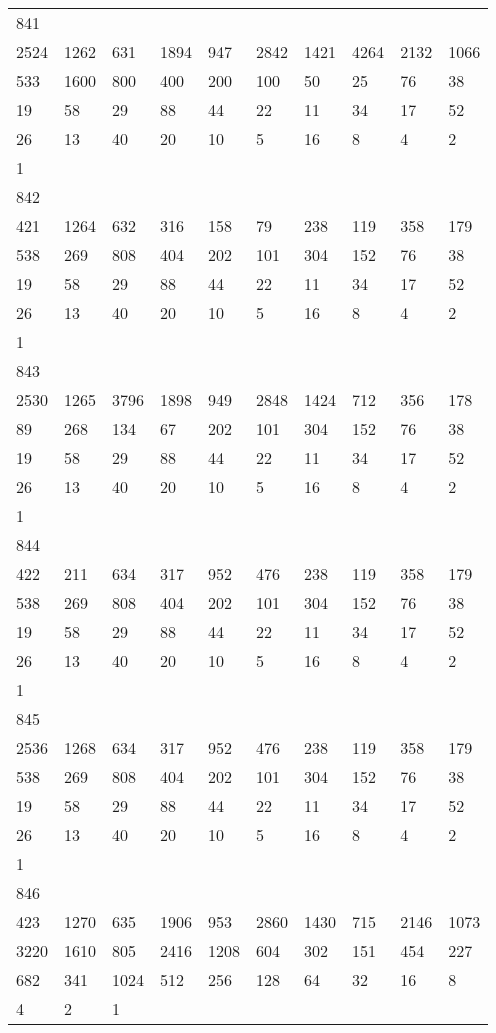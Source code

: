 \begin{longtable}{*{10}{l}}
841&&&&&&&&&\\
2524& 1262& 631& 1894& 947& 2842& 1421& 4264& 2132& 1066\\
533& 1600& 800& 400& 200& 100& 50& 25& 76& 38\\
19& 58& 29& 88& 44& 22& 11& 34& 17& 52\\
26& 13& 40& 20& 10& 5& 16& 8& 4& 2\\
1& \\

842&&&&&&&&&\\
421& 1264& 632& 316& 158& 79& 238& 119& 358& 179\\
538& 269& 808& 404& 202& 101& 304& 152& 76& 38\\
19& 58& 29& 88& 44& 22& 11& 34& 17& 52\\
26& 13& 40& 20& 10& 5& 16& 8& 4& 2\\
1& \\

843&&&&&&&&&\\
2530& 1265& 3796& 1898& 949& 2848& 1424& 712& 356& 178\\
89& 268& 134& 67& 202& 101& 304& 152& 76& 38\\
19& 58& 29& 88& 44& 22& 11& 34& 17& 52\\
26& 13& 40& 20& 10& 5& 16& 8& 4& 2\\
1& \\

844&&&&&&&&&\\
422& 211& 634& 317& 952& 476& 238& 119& 358& 179\\
538& 269& 808& 404& 202& 101& 304& 152& 76& 38\\
19& 58& 29& 88& 44& 22& 11& 34& 17& 52\\
26& 13& 40& 20& 10& 5& 16& 8& 4& 2\\
1& \\

845&&&&&&&&&\\
2536& 1268& 634& 317& 952& 476& 238& 119& 358& 179\\
538& 269& 808& 404& 202& 101& 304& 152& 76& 38\\
19& 58& 29& 88& 44& 22& 11& 34& 17& 52\\
26& 13& 40& 20& 10& 5& 16& 8& 4& 2\\
1& \\

846&&&&&&&&&\\
423& 1270& 635& 1906& 953& 2860& 1430& 715& 2146& 1073\\
3220& 1610& 805& 2416& 1208& 604& 302& 151& 454& 227\\
682& 341& 1024& 512& 256& 128& 64& 32& 16& 8\\
4& 2& 1& \\


\end{longtable}
